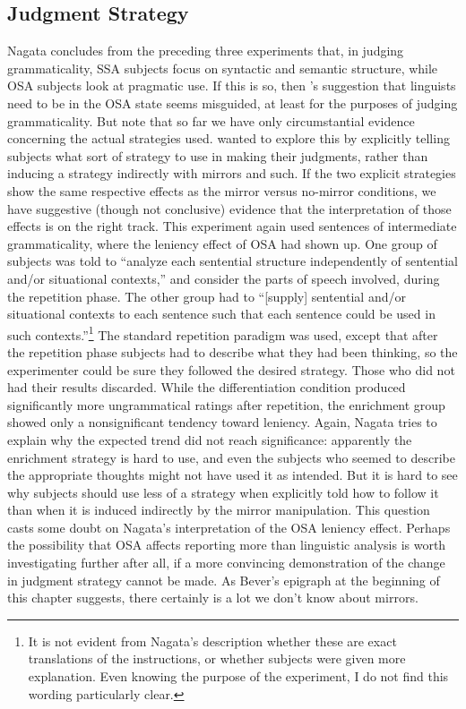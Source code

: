 \subsection{Judgment Strategy}\label{sec:5.2.5}

Nagata concludes from the preceding three experiments that, in judging grammaticality, SSA subjects focus on syntactic and semantic structure, while OSA subjects look at pragmatic use. If this is so, then \citeauthor{CarrollEtAl1981}'s suggestion that linguists need to be in the OSA state seems misguided, at least for the purposes of judging grammaticality. But note that so far we have only circumstantial evidence concerning the actual strategies used. \citet{Nagata1989c} wanted to explore this by explicitly telling subjects what sort of strategy to use in making their judgments, rather than inducing a strategy indirectly with mirrors and such. If the two explicit strategies show the same respective effects as the mirror versus no-mirror conditions, we have suggestive (though not conclusive) evidence that the interpretation of those effects is on the right track. This experiment again used sentences of intermediate grammaticality, where the leniency effect of OSA had shown up. One group of subjects was told to ``analyze each sentential structure independently of sentential and/or situational contexts,'' and consider the parts of speech involved, during the repetition phase. The other group had to ``[supply] sentential and/or situational contexts to each sentence such that each sentence could be used in such contexts.''\footnote{It is not evident from Nagata's description whether these are exact translations of the instructions, or whether subjects were given more explanation. Even knowing the purpose of the experiment, I do not find this wording particularly clear.}
 The standard repetition paradigm was used, except that after the repetition phase subjects had to describe what they had been thinking, so the experimenter could be sure they followed the desired strategy. Those who did not had their results discarded. While the differentiation condition produced significantly more ungrammatical ratings after repetition, the enrichment group showed only a nonsignificant tendency toward leniency. Again, Nagata tries to explain why the expected trend did not reach significance: apparently the enrichment strategy is hard to use, and even the subjects who seemed to describe the appropriate thoughts might not have used it as
intended. But it is hard to see why subjects should use less of a strategy when explicitly told how to follow it than when it is induced indirectly by the mirror manipulation. This question casts some doubt on Nagata's interpretation of the OSA leniency effect. Perhaps the possibility that OSA affects reporting more than linguistic analysis is worth investigating further after all, if a more convincing demonstration of the change in judgment strategy cannot be made. As Bever's epigraph at the beginning of this chapter suggests, there certainly is a lot we don't know about mirrors.

